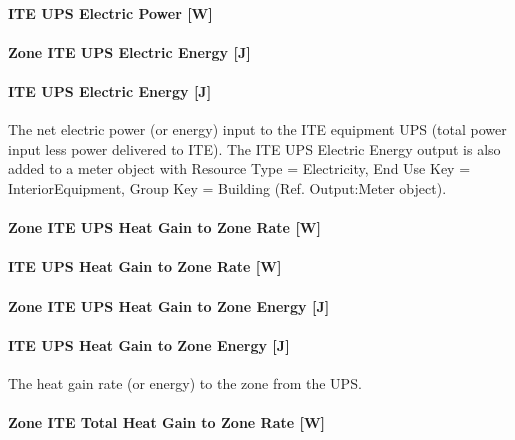 \paragraph{ITE UPS Electric Power {[}W{]}}\label{ite-ups-electric-power-w}

\paragraph{Zone ITE UPS Electric Energy {[}J{]}}\label{zone-ite-ups-electric-energy-j}

\paragraph{ITE UPS Electric Energy {[}J{]}}\label{ite-ups-electric-energy-j}

The net electric power (or energy) input to the ITE equipment UPS (total power input less power delivered to ITE). The ITE UPS Electric Energy output is also added to a meter object with Resource Type = Electricity, End Use Key = InteriorEquipment, Group Key = Building (Ref. Output:Meter object).

\paragraph{Zone ITE UPS Heat Gain to Zone Rate {[}W{]}}\label{zone-ite-ups-heat-gain-to-zone-rate-w}

\paragraph{ITE UPS Heat Gain to Zone Rate {[}W{]}}\label{ite-ups-heat-gain-to-zone-rate-w}

\paragraph{Zone ITE UPS Heat Gain to Zone Energy {[}J{]}}\label{zone-ite-ups-heat-gain-to-zone-energy-j}

\paragraph{ITE UPS Heat Gain to Zone Energy {[}J{]}}\label{ite-ups-heat-gain-to-zone-energy-j}

The heat gain rate (or energy) to the zone from the UPS.

\paragraph{Zone ITE Total Heat Gain to Zone Rate {[}W{]}}\label{zone-ite-total-heat-gain-to-zone-rate-w}

